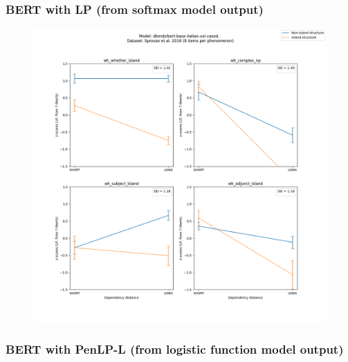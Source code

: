 \clearpage
\subsubsection{BERT with LP (from softmax model output)}
\begin{figure}[h]
	\centering
	\includegraphics[width=1\textwidth]{images/AppendixA/Sprouse_wh_dbmdz_bert-base-italian-xxl-cased_LP-zscores-likert-2022-07-11.png} 
\end{figure}

\clearpage
\subsubsection{BERT with PenLP-L (from logistic function model output)}

